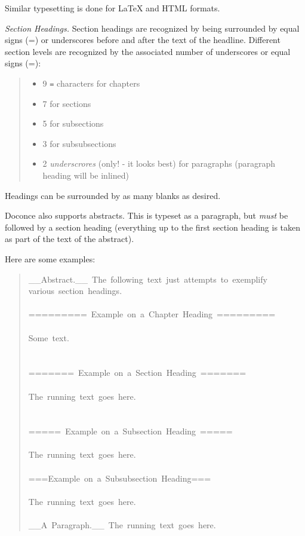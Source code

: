 \documentclass[a4paper]{article}
\begin{document}
Similar typesetting is done for LaTeX and HTML formats.

\emph{Section Headings.} Section headings are recognized by being surrounded by equal signs (=) or
underscores before and after the text of the headline. Different
section levels are recognized by the associated number of underscores
or equal signs (=):
%
\begin{quote}
%
\begin{itemize}

\item 9 \texttt{=} characters for chapters

\item 7 for sections

\item 5 for subsections

\item 3 for subsubsections

\item 2 \emph{underscrores} (only! - it looks best) for paragraphs
(paragraph heading will be inlined)

\end{itemize}

\end{quote}

Headings can be surrounded by as many blanks as desired.

Doconce also supports abstracts. This is typeset as a paragraph, but
\emph{must} be followed by a section heading (everything up to the first
section heading is taken as part of the text of the abstract).

Here are some examples:
%
\begin{quote}{\ttfamily \raggedright \noindent
\_\_Abstract.\_\_~The~following~text~just~attempts~to~exemplify\\
various~section~headings.\\
~\\
=========~Example~on~a~Chapter~Heading~=========\\
~\\
Some~text.\\
~\\
~\\
=======~Example~on~a~Section~Heading~=======\\
~\\
The~running~text~goes~here.\\
~\\
~\\
=====~Example~on~a~Subsection~Heading~=====\\
~\\
The~running~text~goes~here.\\
~\\
===Example~on~a~Subsubsection~Heading===\\
~\\
The~running~text~goes~here.\\
~\\
\_\_A~Paragraph.\_\_~The~running~text~goes~here.
}
\end{quote}
\end{document}
